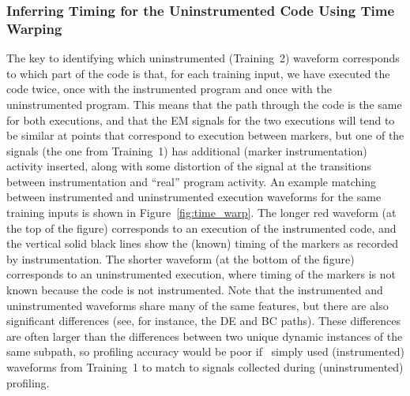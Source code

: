 \subsubsection{Inferring Timing for the Uninstrumented Code Using Time Warping}

The key to identifying which uninstrumented (Training~2) waveform corresponds to which part of the code is that, for each training input, we have executed the code twice, once with the instrumented program and once with the uninstrumented program. This means that the path through the code is the same for both executions, and that the EM signals for the two executions will tend to be similar at points that correspond to execution between markers, but one of the signals (the one from Training~1) has additional (marker instrumentation) activity inserted, along with some distortion of the signal at the transitions between instrumentation and ``real'' program activity. An example matching between instrumented and uninstrumented execution waveforms for the same training inputs is shown in Figure~\ref{fig:time_warp}.  The longer red waveform (at the top of the figure) corresponds to an execution of the instrumented code, and the vertical solid black lines show the (known) timing of the markers as recorded by instrumentation. The shorter waveform (at the bottom of the figure) corresponds to an uninstrumented execution, where timing of the markers is not known because the code is not instrumented. Note that the instrumented and uninstrumented waveforms share many of the same features, but there are also significant differences (see, for instance, the DE and BC paths). These differences are often larger than the differences between two unique dynamic instances of the same subpath, so profiling accuracy would be poor if \zop\ simply used (instrumented) waveforms from Training~1 to match to signals collected during (uninstrumented) profiling.



